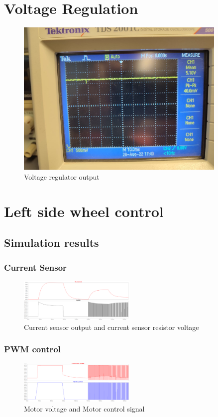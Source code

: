 \clearpage
\section{Voltage Regulation}
\begin{figure}[H]
\centering
\includegraphics[width = 0.9\textwidth]{./Figures/Volt_Reg_Noise.jpeg}
\caption{Voltage regulator output}
\label{fig:volt_reg_noise}
\end{figure}

\clearpage
\section{Left side wheel control}
\subsection{Simulation results}
\subsubsection{Current Sensor}
\begin{figure}[H]
\centering
\includegraphics[width = 0.5\textwidth]{./Figures/CurSens_Left_Sim.png}
\caption{Current sensor output and current sensor resistor voltage}
\label{fig:CurSens_Left_Sim}
\end{figure}
\subsubsection{PWM control}
\begin{figure}[H]
\centering
\includegraphics[width = 0.5\textwidth]{./Figures/PWM_Ctrl_Sim.png}
\caption{Motor voltage and Motor control signal}
\label{fig:PWM_ctrl_sim}
\end{figure}
\clearpage
